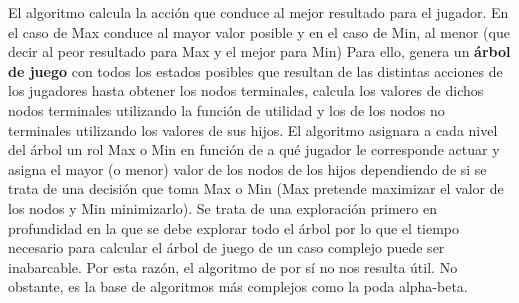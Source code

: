 \documentclass[a4paper, 11pt]{article}
\begin{document}
El algoritmo calcula la acción que conduce al mejor resultado para el jugador. En el caso de Max conduce al mayor valor posible y en el caso de Min, al menor (que decir al peor resultado para Max y el mejor para Min) Para ello, genera un \textbf{árbol de juego} con todos los estados posibles que resultan de las distintas acciones de los jugadores hasta obtener los nodos terminales, calcula los valores de dichos nodos terminales utilizando la función de utilidad y los de los nodos no terminales utilizando los valores de sus hijos. El algoritmo asignara a cada nivel del árbol un rol Max o Min en función de a qué jugador le corresponde actuar y asigna el mayor (o menor) valor de los nodos de los hijos dependiendo de si se trata de una decisión que toma Max o Min (Max pretende maximizar el valor de los nodos y Min minimizarlo). Se trata de una exploración primero en profundidad en la que se debe explorar todo el árbol por lo que el tiempo necesario para calcular el árbol de juego de un caso complejo puede ser inabarcable. Por esta razón, el algoritmo de por sí no nos resulta útil. No obstante, es la base de algoritmos más complejos como la poda alpha-beta.
\end{document}
